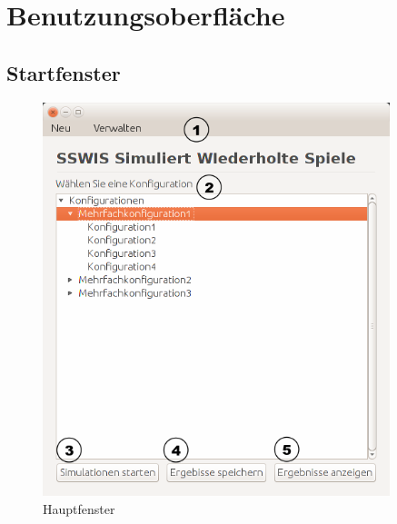 \section{Benutzungsoberfläche}


\subsection{Startfenster}

\begin{figure}[!hp] 
  \centering
     \includegraphics[width=0.9\textwidth]{GUI_Entwurf/Startfenster.png}
  \caption{Hauptfenster}
  \label{fig:Bild1}
\end{figure}

